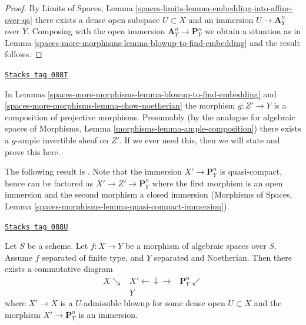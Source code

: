 \begin{proof}
By Limits of Spaces, Lemma
\ref{spaces-limits-lemma-embedding-into-affine-over-qs}
there exists a dense open subspace $U \subset X$ and an immersion
$U \to \mathbf{A}^n_Y$ over $Y$. Composing with the open immersion
$\mathbf{A}^n_Y \to \mathbf{P}^n_Y$ we obtain a situation as in
Lemma \ref{spaces-more-morphisms-lemma-blowup-to-find-embedding} and the result
follows.
\end{proof}

\begin{remark}
\label{spaces-more-morphisms-remark-chow-Noetherian}
\href{https://stacks.math.columbia.edu/tag/088T}{\texttt{Stacks tag 088T}}

In Lemmas \ref{spaces-more-morphisms-lemma-blowup-to-find-embedding} and \ref{spaces-more-morphisms-lemma-chow-noetherian}
the morphism $g : Z' \to Y$ is a composition of projective morphisms.
Presumably (by the analogue for algebraic spaces of
Morphisms, Lemma \ref{morphisms-lemma-ample-composition})
there exists a $g$-ample invertible sheaf on $Z'$.
If we ever need this, then we will state and prove this here.
\end{remark}

The following result is \cite[IV Theorem 3.1]{Kn}. Note that the immersion
$X' \to \mathbf{P}^n_Y$ is quasi-compact, hence can be factored as
$X' \to Z' \to \mathbf{P}^n_Y$ where the first morphism is an
open immersion and the second morphism a closed immersion
(Morphisms of Spaces, Lemma
\ref{spaces-morphisms-lemma-quasi-compact-immersion}).

\begin{lemma}

\label{spaces-more-morphisms-lemma-chow-noetherian-separated}
\href{https://stacks.math.columbia.edu/tag/088U}{\texttt{Stacks tag 088U}}

\begin{reference}
\cite[IV Theorem 3.1]{Kn}
\end{reference}
Let $S$ be a scheme. Let $f : X \to Y$ be a morphism of algebraic spaces
over $S$. Assume $f$ separated of finite type, and $Y$ separated and
Noetherian. Then there exists a commutative diagram
$$
\begin{array}{ccc}X \searrow & X' \longleftarrow\downarrow\longrightarrow & \mathbf{P}^n_Y \swarrow \\  & Y & \end{array}
$$
where $X' \to X$ is a $U$-admissible blowup for some dense open
$U \subset X$ and the morphism $X' \to \mathbf{P}^n_Y$ is an immersion.
\end{lemma}

